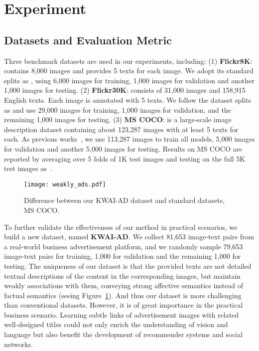 \documentclass[10pt,twocolumn,letterpaper]{article}
\newcommand{\Ads}{KWAI-AD}
\begin{document}
\section{Experiment}

\subsection{Datasets and Evaluation Metric}
\label{sec:exp_dataset}


Three benchmark datasets are used in our experiments, including: (1) \textbf{Flickr8K}: contains 8,000 images and provides 5 texts for each image. We adopt its standard splits as \cite{Niu2017Hierarchical,ma2015multimodal}, using 6,000 images for training, 1,000 images for validation and another 1,000 images for testing. (2) \textbf{Flickr30K}: consists of 31,000 images and 158,915 English texts. Each image is annotated with 5 texts. We follow the dataset splits as \cite{lee2018stacked,faghri2017vse++} and use 29,000 images for training, 1,000 images for validation, and the remaining 1,000 images for testing. (3) \textbf{MS COCO}: is a large-scale image description dataset containing about 123,287 images with at least 5 texts for each. As previous works~\cite{lee2018stacked,faghri2017vse++}, we use 113,287 images to train all models, 5,000 images for validation and another 5,000 images for testing. Results on MS COCO are reported by averaging over 5 folds of 1K test images and testing on the full 5K test images as~\cite{lee2018stacked}.

\begin{figure}[!t]\centering
 \texttt{[image: weakly\_ads.pdf]}
  \caption{Difference between our \Ads{} dataset and standard datasets, \eg{} MS COCO.}
  \label{fig:weakly_ads}
\end{figure}

To further validate the effectiveness of our method in practical scenarios, we build a new dataset, named \textbf{\Ads{}}. We collect 81,653 image-text pairs from a real-world business advertisement platform, and we randomly sample 79,653 image-text pairs for training, 1,000 for validation and the remaining 1,000 for testing. The uniqueness of our dataset is that the provided texts are not detailed textual descriptions of the content in the corresponding images, but maintain weakly associations with them, conveying strong affective semantics instead of factual semantics (seeing Figure~\ref{fig:weakly_ads}). And thus our dataset is more challenging than conventional datasets. However, it is of great importance in the practical business scenario. Learning subtle links of advertisement images with related well-designed titles could not only enrich the understanding of vision and language but also benefit the development of recommender systems and social networks.
\end{document}
